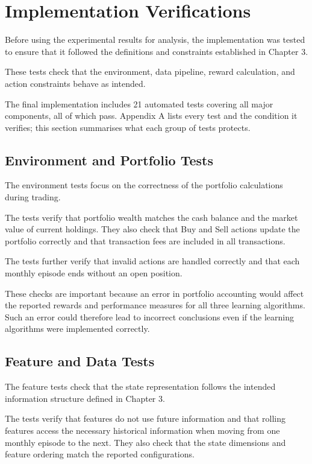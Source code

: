 \section{Implementation Verifications}

Before using the experimental results for analysis, the implementation
was tested to ensure that it followed the definitions and constraints
established in Chapter 3.

These tests check that the environment, data pipeline, reward
calculation, and action constraints behave as intended.

The final implementation includes 21 automated tests covering all major
components, all of which pass. Appendix A lists every test and the
condition it verifies; this section summarises what each group of tests
protects.

\subsection{Environment and Portfolio Tests}

The environment tests focus on the correctness of the portfolio
calculations during trading.

The tests verify that portfolio wealth matches the cash balance and the
market value of current holdings. They also check that Buy and Sell
actions update the portfolio correctly and that transaction fees are
included in all transactions.

The tests further verify that invalid actions are handled correctly and
that each monthly episode ends without an open position.

These checks are important because an error in portfolio accounting
would affect the reported rewards and performance measures for all three
learning algorithms. Such an error could therefore lead to incorrect
conclusions even if the learning algorithms were implemented correctly.

\subsection{Feature and Data Tests}

The feature tests check that the state representation follows the
intended information structure defined in Chapter 3.

The tests verify that features do not use future information and that
rolling features access the necessary historical information when moving
from one monthly episode to the next. They also check that the state
dimensions and feature ordering match the reported configurations.

